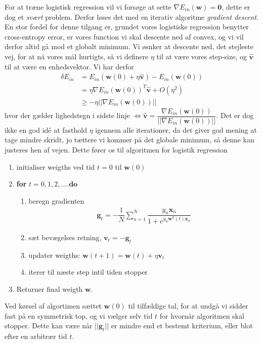 \documentclass[paper=a4, fontsize=11pt]{scrartcl} %
\numberwithin{equation}{section} %
\numberwithin{figure}{section} %
\numberwithin{table}{section} %
\begin{document}
	For at træne logistisk regression vil vi forsøge at sette $\nabla E_{in}(\mathbf{w})=\mathbf{0}$, dette er dog et \textit{svært} problem. Derfor løses det med en iterativ algoritme \textit{gradient descent}. En stor fordel for denne tilgang er, grundet vores logistiske regression benytter cross-entropy error, er vores function vi skal descente ned af convex, og vi vil derfor altid gå mod et globalt minimum. Vi øsnker at descente ned, det stejleste vej, for at nå vores mål hurtigts, så vi definere $\eta$ til at være vores step-size, og $\hat{\mathbf{v}}$ til at være en enhedsvektor. Vi har derfor
	\begin{align*}
	\delta E_{in} &= E_{in}(\mathbf{w}(0)+\eta\hat{\mathbf{v}})-E_{in}(\mathbf{w}(0))\\
	&=\eta\nabla E_{in}(\mathbf{w}(0))^T\hat{\mathbf{v}}+O(\eta^2) \\
	&\geq -\eta||\nabla E_{in}(\mathbf{w}(0))||
	\end{align*}
	hvor der gælder lighedstegn i sidste linje $\iff \hat{\mathbf{v}}=\dfrac{\nabla E_{in}(\mathbf{w}(0))}{||\nabla E_{in}(\mathbf{w}(0))||}$. Det er dog ikke en god idé at fasthold $\eta$ igennem alle iterationer, da det giver god mening at tage mindre skridt, jo tættere vi kommer på det globale minimum, så denne kan justeres hen  af vejen. Dette fører os til algoritmen for logistik regression
	\begin{mdframed}
	\begin{enumerate}
		\item initialiser weigths ved tid $t=0$ til $\mathbf{w}(0)$
		\item \textbf{for} $t=0,1,2,.... \mathbf{do}$
		\begin{enumerate}
			\item beregn gradienten
			\begin{align*}
			\mathbf{g}_t =-\dfrac{1}{N}\sum_{n=1}^{N}\dfrac{y_n\mathbf{x}_n}{1+e^{y_n\mathbf{w}^T(t)\mathbf{x}_n}}
			\end{align*}
			\item sæt bevægelses retning, $\mathbf{v}_t=-\mathbf{g}_t$
			\item updater weigths: $\mathbf{w}(t+1)=\mathbf{w}(t)+\eta\mathbf{v}_t$
			\item iterer til næste step intil tiden stopper
		\end{enumerate}
		\item Returner final weigth $\mathbf{w}$.
	\end{enumerate}
	\end{mdframed}
	Ved kørsel af algortimen sættet $\mathbf{w}(0)$ til tilfældige tal, for at undgå vi sidder fast på en symmetrisk top, og vi vælger selv tid $t$ for hvornår algoritmen skal stopper. Dette kan være når $||\mathbf{g}_t||$ er mindre end et bestemt kriterium, eller blot efter en arbitrær tid $t$. \\
	
\end{document}
